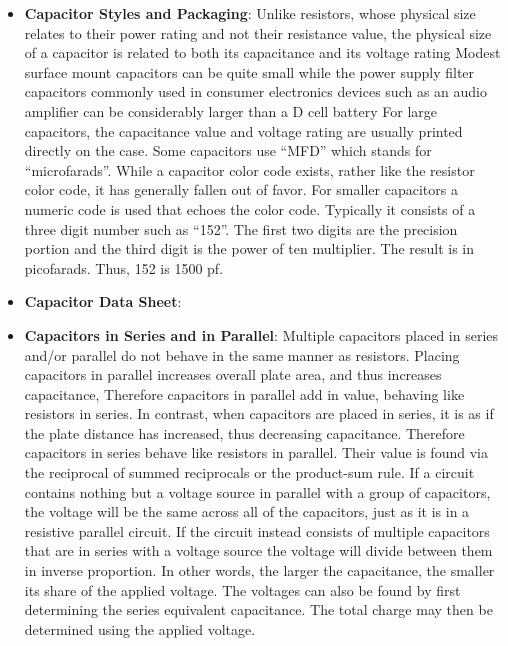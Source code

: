 \documentclass{report}
\begin{document}
\begin{itemize}
        \item \textbf{Capacitor Styles and Packaging}: Unlike resistors, whose physical size relates to their power rating and not their resistance value, the physical size of a capacitor is related to both its capacitance and its voltage rating
            \bigbreak \noindent 
            Modest surface mount capacitors can be quite small while the power supply filter capacitors commonly used in consumer electronics devices such as an audio amplifier can be considerably larger than a D cell battery
            \bigbreak \noindent 
            For large capacitors, the capacitance value and voltage rating are usually printed directly on the case. Some capacitors use “MFD” which stands for “microfarads”. While a capacitor color code exists, rather like the resistor color code, it has generally fallen out of favor. For smaller capacitors a numeric code is used that echoes the color code. Typically it consists of a three digit number such as “152”.
            \bigbreak \noindent 
            The first two digits are the precision portion and the third digit is the power of ten multiplier. The result is in picofarads. Thus, 152 is 1500 pf.
            \bigbreak \noindent 
            \bigbreak \noindent
        \item \textbf{Capacitor Data Sheet}: 
            \bigbreak \noindent 
        \item \textbf{Capacitors in Series and in Parallel}: Multiple capacitors placed in series and/or parallel do not behave in the same manner as resistors. Placing capacitors in parallel increases overall plate area, and thus increases capacitance,
            \bigbreak \noindent 
            Therefore capacitors in parallel add in value, behaving like resistors in series. In contrast, when capacitors are placed in series, it is as if the plate distance has increased, thus decreasing capacitance. Therefore capacitors in series behave like resistors in parallel. Their value is found via the reciprocal of summed reciprocals or the product-sum rule.
            \bigbreak \noindent 
            If a circuit contains nothing but a voltage source in parallel with a group of capacitors, the voltage will be the same across all of the capacitors, just as it is in a resistive parallel circuit. If the circuit instead consists of multiple capacitors that are in series with a voltage source
            \bigbreak \noindent 
            the voltage will divide between them in inverse proportion. In other words, the larger the capacitance, the smaller its share of the applied voltage. The voltages can also be found by first determining the series equivalent capacitance. The total charge may then be determined using the applied voltage. 

\end{itemize}
\end{document}
